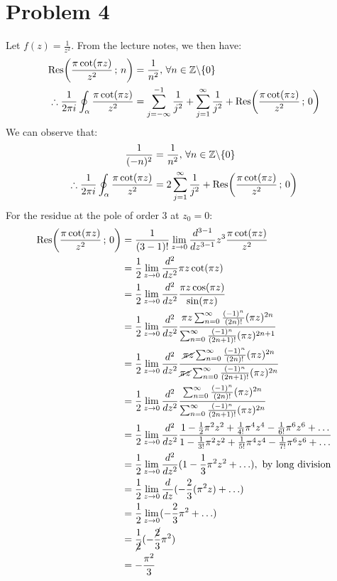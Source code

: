 \documentclass[letterpaper, titlepage, DIV=14]{scrartcl}
\begin{document}
    
    \section*{Problem 4}
    Let $f(z)=\frac{1}{z^{2}}$. From the lecture notes, we then have:
    \begin{align*}
      \Res(\frac{\pi\cot(\pi z)}{z^{2}} \, ; \, n) &= \frac{1}{n^{2}}, \, \forall n \in \mathbb{Z}\backslash 
    \{0\} \\
    \therefore \frac{1}{2\pi i}\oint_{\alpha}\frac{\pi\cot(\pi z)}{z^{2}} &= \sum_{j=-\infty}^{-1} \frac{1}{j^{2}} + \sum_{j=1}^{\infty} \frac{1}{j^{2}} + \Res(\frac{\pi\cot(\pi z)}{z^{2}} \, ; \, 0)
    \end{align*}
    We can observe that:
    \begin{align}
      \frac{1}{(-n)^{2}} &= \frac{1}{n^{2}}, \, \forall n\in \mathbb{Z}\backslash\{0\} \nonumber \\ 
      \therefore \frac{1}{2\pi i}\oint_{\alpha}\frac{\pi\cot(\pi z)}{z^{2}} &= 2\sum_{j=1}^{\infty} \frac{1}{j^{2}} + \Res(\frac{\pi\cot(\pi z)}{z^{2}} \, ; \, 0) \label{eq:4-1}
    \end{align}
    For the residue at the pole of order 3 at $z_{0}=0$:
    \begin{align*}
      \Res(\frac{\pi\cot(\pi z)}{z^{2}} \, ; \, 0) &= \frac{1}{(3-1)!} \lim_{z\to0}\frac{d^{3-1}}{dz^{3-1}}z^{3}\frac{\pi\cot(\pi z)}{z^{2}} \\
      &= \frac{1}{2} \lim_{z\to0}\frac{d^{2}}{dz^{2}}\pi z\cot(\pi z) \\
      &= \frac{1}{2} \lim_{z\to0}\frac{d^{2}}{dz^{2}}\frac{\pi z \cos(\pi z)}{\sin(\pi z)} \\
      &= \frac{1}{2} \lim_{z\to0}\frac{d^{2}}{dz^{2}}\frac{\pi z\sum_{n=0}^{\infty}\frac{(-1)^{n}}{(2n)!}(\pi z)^{2n}}{\sum_{n=0}^{\infty}\frac{(-1)^{n}}{(2n+1)!}(\pi z)^{2n+1}} \\
      &= \frac{1}{2} \lim_{z\to0}\frac{d^{2}}{dz^{2}}\frac{\cancel{\pi z}\sum_{n=0}^{\infty}\frac{(-1)^{n}}{(2n)!}(\pi z)^{2n}}{\cancel{\pi z}\sum_{n=0}^{\infty}\frac{(-1)^{n}}{(2n+1)!}(\pi z)^{2n}} \\
      &= \frac{1}{2} \lim_{z\to0}\frac{d^{2}}{dz^{2}}\frac{\sum_{n=0}^{\infty}\frac{(-1)^{n}}{(2n)!}(\pi z)^{2n}}{\sum_{n=0}^{\infty}\frac{(-1)^{n}}{(2n+1)!}(\pi z)^{2n}} \\
      &= \frac{1}{2} \lim_{z\to0}\frac{d^{2}}{dz^{2}}\frac{1-\frac{1}{2}\pi^{2}z^{2}+\frac{1}{4!}\pi^{4}z^{4}-\frac{1}{6!}\pi^{6}z^{6} + \ldots}{1 - \frac{1}{3!}\pi^{2}z^{2} + \frac{1}{5!}\pi^{4}z^{4} -\frac{1}{7!}\pi^{6}z^{6} + \ldots } \\
      &= \frac{1}{2} \lim_{z\to0}\frac{d^{2}}{dz^{2}} (1 - \frac{1}{3}\pi^{2} z^{2} + \ldots), \text{ by long division} \\
      &= \frac{1}{2} \lim_{z\to0}\frac{d}{dz} (-\frac{2}{3}(\pi^{2} z) + \ldots) \\
      &= \frac{1}{2} \lim_{z\to0}(-\frac{2}{3}\pi^{2} + \ldots) \\
      &= \frac{1}{\cancel{2}}(-\frac{\cancel{2}}{3}\pi^{2}) \\
      &= -\frac{\pi^{2}}{3}
    \end{align*}
\end{document}
